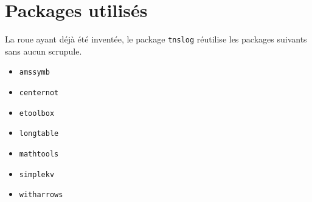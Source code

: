 \documentclass[12pt,a4paper]{article}
\begin{document}
\section{Packages utilisés}

La roue ayant déjà été inventée, le package \verb#tnslog# réutilise les packages suivants sans aucun scrupule.

\begin{multicols}{4}
    \begin{itemize}
        \item \verb#amssymb#
        \item \verb#centernot#
        \item \verb#etoolbox#
        \item \verb#longtable#
        \item \verb#mathtools#
        \item \verb#simplekv#
        \item \verb#witharrows#
    \end{itemize}
\end{multicols}
\end{document}
